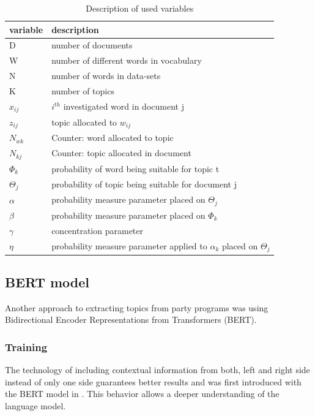 \begin{table}[h]
    \begin{tabular}{|p{1cm}||p{6.5cm}| }
        \hline
        variable & description\\
        \hline
        D & number of documents\\
        W & number of different words in vocabulary\\ 
        N & number of words in data-sets\\
        K & number of topics\\
        $x_{ij}$ & $i^{th}$ investigated word in document j\\
        $z_{ij}$ & topic allocated to $w_{ij}$\\
        $N_{wk}$ & Counter: word allocated to topic\\
        $N_{kj}$ & Counter: topic allocated in document\\
        $\Phi_k$ & probability of word being suitable for topic t\\
        $\Theta_j$ & probability of topic being suitable for document j\\
        $\alpha$ & probability measure parameter placed on $\Theta_j$ \\ 
        $\beta$ & probability measure parameter placed on $\Phi_k$ \\
        $\gamma$ & concentration parameter\\
        $\eta$ & probability measure parameter applied to $\alpha_k$ placed on $\Theta_j$\\
        \hline
    \end{tabular}
    \caption{Description of used variables \citet{newman2009distributed}}
    \label{tab:variable_table}
\end{table}




\subsection{BERT model}
Another approach to extracting topics from party programs was using Bidirectional Encoder Representations from Transformers (BERT). 
\subsubsection{Training}
The technology of including contextual information from both, left and right side instead of only one side guarantees better results and was first introduced with the BERT model in \citet{Devlin2019BERTPO}. This behavior allows a deeper understanding of the language model.

